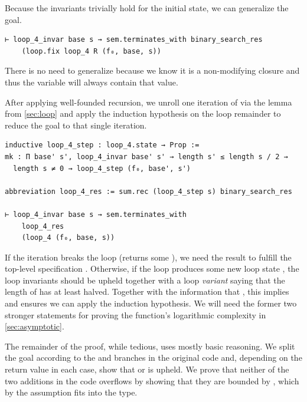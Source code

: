 Because the invariants trivially hold for the initial state, we can generalize
the goal.

\begin{verbatim}
⊢ loop_4_invar base s → sem.terminates_with binary_search_res
    (loop.fix loop_4 R (f₀, base, s))
\end{verbatim}

There is no need to generalize  because we know it is a non-modifying closure
and thus the variable  will always contain that value.

After applying well-founded recursion, we unroll one iteration of
 via the lemma  from \autoref{sec:loop} and
apply the induction hypothesis on the loop remainder to reduce the goal to that
single iteration.

\begin{verbatim}
inductive loop_4_step : loop_4.state → Prop :=
mk : Π base' s', loop_4_invar base' s' → length s' ≤ length s / 2 →
  length s ≠ 0 → loop_4_step (f₀, base', s')

abbreviation loop_4_res := sum.rec (loop_4_step s) binary_search_res

⊢ loop_4_invar base s → sem.terminates_with
    loop_4_res
    (loop_4 (f₀, base, s))
\end{verbatim}

If the iteration breaks the loop (returns some ), we need the
result to fulfill the top-level specification .
Otherwise, if the loop produces
some new loop state , the loop invariants should be upheld
together with a loop \emph{variant} saying that the length of  has at
least halved. Together with the information that , this
implies  and ensures we can apply the induction
hypothesis. We will
need the former two stronger statements for proving the function's logarithmic
complexity in \autoref{sec:asymptotic}.

The remainder of the proof, while tedious, uses mostly basic reasoning. We split
the goal according to the  and  branches in the original
code and, depending on the return value in each case, show that
 or  is upheld. We prove that neither
of the two additions in the code overflows by showing that they are bounded by
, which by the assumption  fits into
the  type.